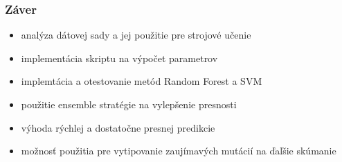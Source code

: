 \documentclass[10pt,xcolor=pdflatex]{beamer}
\begin{document}
\begin{frame}\frametitle{Záver}
\begin{itemize}
	\item analýza dátovej sady a jej použitie pre strojové učenie
	\item implementácia skriptu na výpočet parametrov
	\item implemtácia a otestovanie metód Random Forest a SVM
	\item použitie ensemble stratégie na vylepšenie presnosti
	\item výhoda rýchlej a dostatočne presnej predikcie
	\item možnosť použitia pre vytipovanie zaujímavých mutácií na ďaľšie skúmanie
\end{itemize}

\end{frame}




\end{document}
